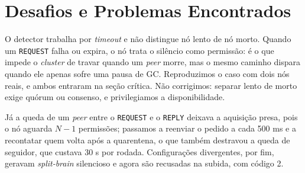 \section{Desafios e Problemas Encontrados}

O detector trabalha por \textit{timeout} e não distingue nó lento de nó morto. Quando um
\texttt{REQUEST} falha ou expira, o nó trata o silêncio como permissão: é o que impede o
\textit{cluster} de travar quando um \textit{peer} morre, mas o mesmo caminho dispara quando ele
apenas sofre uma pausa de GC. Reproduzimos o caso com dois nós reais, e ambos entraram na seção
crítica. Não corrigimos: separar lento de morto exige quórum ou consenso, e privilegiamos a
disponibilidade.

Já a queda de um \textit{peer} entre o \texttt{REQUEST} e o \texttt{REPLY} deixava a aquisição
presa, pois o nó aguarda $N-1$ permissões; passamos a reenviar o pedido a cada 500 ms e a
recontatar quem volta após a quarentena, o que também destravou a queda de seguidor, que custava
30 s por rodada. Configurações divergentes, por fim, geravam \textit{split-brain} silencioso e
agora são recusadas na subida, com código 2.

